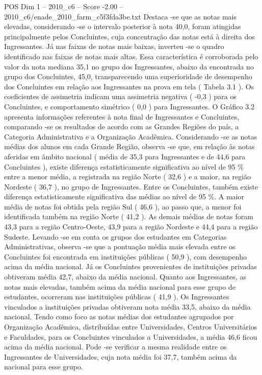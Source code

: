 \begin{textsample}{POS Dim 1 – 2010\_c6 – Score -2.00 – 2010\_c6/enade\_2010\_farm\_c5f3fda3be.txt}
Destaca -se que as notas mais elevadas, considerando -se o intervalo posterior à nota 40,0, foram atingidas principalmente pelos Concluintes, cuja concentração das notas está à direita dos Ingressantes.
Já nas faixas de notas mais baixas, inverteu -se o quadro identificado nas faixas de notas mais altas.
Essa característica é corroborada pelo valor da nota mediana 35,1 no grupo dos Ingressantes, abaixo da encontrada no grupo dos Concluintes, 45,0, transparecendo uma superioridade de desempenho dos Concluintes em relação aos Ingressantes na prova em tela ( Tabela 3.1 ).
Os coeficientes de assimetria indicam uma assimetria negativa ( -0,3 ) para os Concluintes, e comportamento simétrico ( 0,0 ) para Ingressantes.
O Gráfico 3.2 apresenta informações referentes à nota final de Ingressantes e Concluintes, comparando -se os resultados de acordo com as Grandes Regiões do país, a Categoria Administrativa e a Organização Acadêmica.
Considerando -se as notas médias dos alunos em cada Grande Região, observa -se que, em relação às notas aferidas em âmbito nacional ( média de 35,3 para Ingressantes e de 44,6 para Concluintes ), existe diferença estatisticamente significativa ao nível de 95 \% entre a menor média, a registrada na região Norte ( 32,6 ) e a maior, na região Nordeste ( 36,7 ), no grupo de Ingressantes.
Entre os Concluintes, também existe diferença estatisticamente significativa das médias ao nível de 95 \%.
A maior média de notas foi obtida pela região Sul ( 46,6 ), ao passo que, a menor foi identificada também na região Norte ( 41,2 ).
As demais médias de notas foram 43,3 para a região Centro-Oeste, 43,9 para a região Nordeste e 44,4 para a região Sudeste.
Levando -se em conta os grupos dos estudantes em Categorias Administrativas, observa -se que a pontuação média mais elevada entre os Concluintes foi encontrada em instituições públicas ( 50,9 ), com desempenho acima da média nacional.
Já os Concluintes provenientes de instituições privadas obtiveram média 42,7, abaixo da média nacional.
Quanto aos Ingressantes, as notas mais elevadas, também acima da média nacional para esse grupo de estudantes, ocorreram nas instituições públicas ( 41,9 ).
Os Ingressantes vinculados a instituições privadas obtiveram nota média 33,5, abaixo da média nacional.
Tendo como foco as notas médias dos estudantes agrupados por Organização Acadêmica, distribuídas entre Universidades, Centros Universitários e Faculdades, para os Concluintes vinculados a Universidades, a média 46,6 ficou acima da média nacional.
Pode -se verificar a mesma realidade entre os Ingressantes de Universidades, cuja nota média foi 37,7, também acima da nacional para esse grupo.

\end{textsample}
